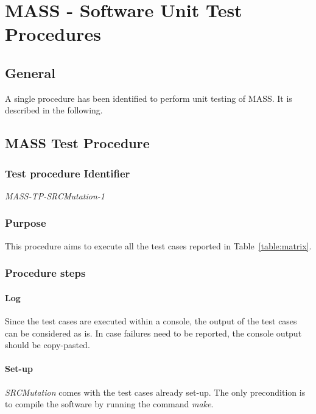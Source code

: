 
\chapter{MASS - Software Unit Test Procedures}

\section{General}

A single procedure has been identified to perform unit testing of MASS. It is described in the following.

\section{MASS Test Procedure}

\subsection{Test procedure Identifier}

\emph{MASS-TP-SRCMutation-1}


\subsection{Purpose}

This procedure aims to execute all the test cases reported in Table~\ref{table:matrix}.

\subsection{Procedure steps}

\subsubsection{Log}
Since the test cases are executed within a console, the output of the test cases can be considered as is.
In case failures need to be reported, the console output should be copy-pasted.
\subsubsection{Set-up}
\emph{SRCMutation} comes with the test cases already set-up. The only precondition is to compile the software by running the command \emph{make}.

